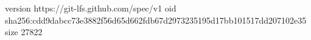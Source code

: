 version https://git-lfs.github.com/spec/v1
oid sha256:cdd9dabcc73e3882f56d65d662fdb67d2973235195d17bb101517dd207102e35
size 27822
